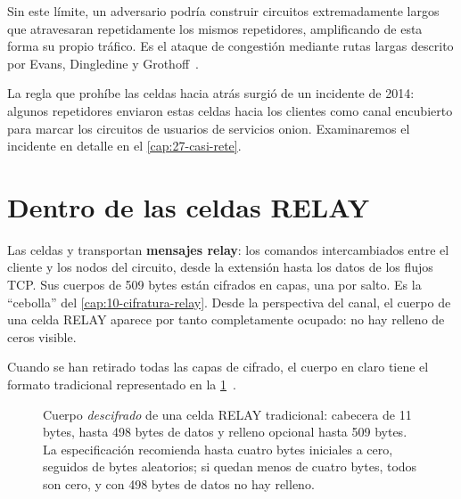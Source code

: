 Sin este límite, un adversario podría construir circuitos extremadamente largos que atravesaran repetidamente los mismos repetidores, amplificando de esta forma su propio tráfico. Es el ataque de congestión mediante rutas largas descrito por Evans, Dingledine y Grothoff~\cite{evans2009congestion}.

\begin{storia}
La regla que prohíbe las celdas  hacia atrás surgió de un incidente de 2014: algunos repetidores enviaron estas celdas hacia los clientes como canal encubierto para marcar los circuitos de usuarios de servicios onion. Examinaremos el incidente en detalle en el \cref{cap:27-casi-rete}.
\end{storia}

\section{Dentro de las celdas RELAY}\label{sec:relay}

Las celdas  y  transportan \textbf{mensajes relay}: los comandos intercambiados entre el cliente y los nodos del circuito, desde la extensión hasta los datos de los flujos TCP. Sus cuerpos de 509 bytes están cifrados en capas, una por salto. Es la \enquote{cebolla} del \cref{cap:10-cifratura-relay}. Desde la perspectiva del canal, el cuerpo de una celda RELAY aparece por tanto completamente ocupado: no hay relleno de ceros visible.

Cuando se han retirado todas las capas de cifrado, el cuerpo en claro tiene el formato tradicional representado en la \cref{fig:relay}~.

\begin{figure}[htbp]
\centering

\caption{Cuerpo \emph{descifrado} de una celda RELAY tradicional: cabecera de 11 bytes, hasta 498 bytes de datos y relleno opcional hasta 509 bytes. La especificación recomienda hasta cuatro bytes iniciales a cero, seguidos de bytes aleatorios; si quedan menos de cuatro bytes, todos son cero, y con 498 bytes de datos no hay relleno.}
\label{fig:relay}
\end{figure}

